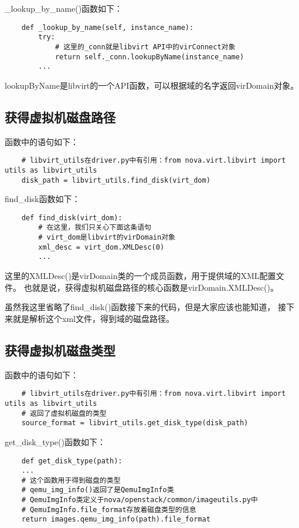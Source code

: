 \documentclass[a4paper,left=1.5cm,right=1.5cm,11pt]{article}
\begin{document}
	\_lookup\_by\_name()函数如下：
	\begin{lstlisting}
	def _lookup_by_name(self, instance_name):
        try:
			# 这里的_conn就是libvirt API中的virConnect对象
            return self._conn.lookupByName(instance_name)
        ...
	\end{lstlisting}

	lookupByName是libvirt的一个API函数，可以根据域的名字返回virDomain对象。

\subsection{获得虚拟机磁盘路径}
	函数中的语句如下：
	\begin{lstlisting}
	# libvirt_utils在driver.py中有引用：from nova.virt.libvirt import utils as libvirt_utils
	disk_path = libvirt_utils.find_disk(virt_dom)
	\end{lstlisting}

	find\_disk函数如下：
	\begin{lstlisting}
	def find_disk(virt_dom):
		# 在这里，我们只关心下面这条语句
		# virt_dom是libvirt的virDomain对象
		xml_desc = virt_dom.XMLDesc(0)
		...
	\end{lstlisting}

	这里的XMLDesc()是virDomain类的一个成员函数，用于提供域的XML配置文件。
	也就是说，获得虚拟机磁盘路径的核心函数是virDomain.XMLDesc()。\par

	虽然我这里省略了find\_disk()函数接下来的代码，但是大家应该也能知道，
	接下来就是解析这个xml文件，得到域的磁盘路径。

\subsection{获得虚拟机磁盘类型}
	函数中的语句如下：
	\begin{lstlisting}
	# libvirt_utils在driver.py中有引用：from nova.virt.libvirt import utils as libvirt_utils
	# 返回了虚拟机磁盘的类型
	source_format = libvirt_utils.get_disk_type(disk_path)
	\end{lstlisting}

	get\_disk\_type()函数如下：
	\begin{lstlisting}
	def get_disk_type(path):
    ...
	# 这个函数用于得到磁盘的类型
	# qemu_img_info()返回了是QemuImgInfo类
	# QemuImgInfo类定义于nova/openstack/common/imageutils.py中
	# QemuImgInfo.file_format存放着磁盘类型的信息
    return images.qemu_img_info(path).file_format
	\end{lstlisting}
\end{document}
